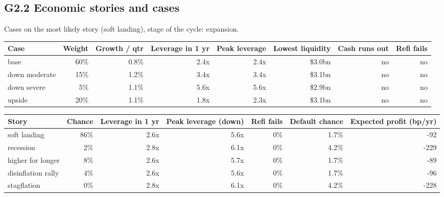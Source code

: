\documentclass[11pt,a4paper]{article}
\begin{document}
\subsection*{G2.2 Economic stories and cases}
Cases on the most likely story (soft landing), stage of the cycle: expansion.
\begin{center}\scriptsize\setlength{\tabcolsep}{3.5pt}\begin{tabular}{@{}lrrrrrrr@{}}\toprule
Case & Weight & Growth / qtr & Leverage in 1 yr & Peak leverage & Lowest liquidity & Cash runs out & Refi fails \\\midrule
base & 60\% & 0.8\% & 2.4x & 2.4x & \$3.0bn & no & no \\
down moderate & 15\% & 1.2\% & 3.4x & 3.4x & \$3.1bn & no & no \\
down severe & 5\% & 1.1\% & 5.6x & 5.6x & \$2.9bn & no & no \\
upside & 20\% & 1.1\% & 1.8x & 2.3x & \$3.1bn & no & no \\
\bottomrule\end{tabular}\end{center}
\begin{center}\scriptsize\setlength{\tabcolsep}{3.5pt}\begin{tabular}{@{}lrrrrrr@{}}\toprule
Story & Chance & Leverage in 1 yr & Peak leverage (down) & Refi fails & Default chance & Expected profit (bp/yr) \\\midrule
soft landing & 86\% & 2.6x & 5.6x & 0\% & 1.7\% & -92 \\
recession & 2\% & 2.8x & 6.1x & 0\% & 4.2\% & -229 \\
higher for longer & 8\% & 2.6x & 5.7x & 0\% & 1.7\% & -89 \\
disinflation rally & 4\% & 2.6x & 5.6x & 0\% & 1.7\% & -96 \\
stagflation & 0\% & 2.8x & 6.1x & 0\% & 4.2\% & -228 \\
\bottomrule\end{tabular}\end{center}
\end{document}
